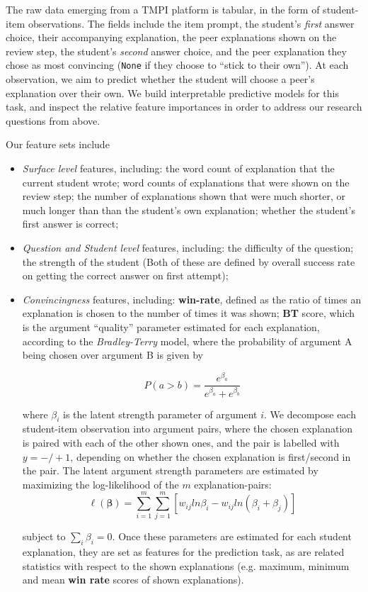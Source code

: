 \documentclass[sigconf]{acmart}
\begin{document}
The raw data emerging from a TMPI platform is tabular, in the form of 
student-item observations.
The fields include the item prompt, the student's \textit{first} answer choice, 
their accompanying explanation, the peer explanations shown on the review step, 
the student's \textit{second} answer choice, and the peer explanation they 
chose as most convincing (\verb|None| if they choose to ``stick to their own'').
At each observation, we aim to predict whether the student will choose a peer's 
explanation over their own.
We build interpretable predictive models for this task, and inspect the 
relative feature importances in order to address our research questions from 
above.

Our feature sets include
\begin{itemize}
	\item \textit{Surface level} features, including: 
	the word count of explanation that the current student wrote; 
	word counts of explanations that were shown on the review step; 
	the number of explanations shown that were much shorter, or much longer 
	than than the student's own explanation; 
	whether the student's first answer is correct;

	\item \textit{Question and Student level} features, including: 
	the difficulty of the question; 
	the strength of the student
	(Both of these are defined by overall success rate on getting the correct 
	answer on first attempt);
	
	\item \textit{Convincingness} features, including: 
	\textbf{win-rate}, defined as the ratio of times an explanation is chosen 
	to the number of times it was shown; 
	\textbf{BT} score, which is the argument ``quality'' parameter 
	estimated for each explanation, according to the \textit{Bradley-Terry} 
	model, where the probability of argument A being chosen over argument B is 
	given by 

$$
P(a>b) = 
\frac{e^{\beta_a}}{e^{\beta_a}+e^{\beta_b}}
$$

where $\beta_i$ is the latent strength parameter of argument $i$. 
We decompose each student-item observation into argument pairs, where the 
chosen explanation is paired with each of the other shown ones, and the pair is 
labelled with $y=-/+1$, depending on whether the chosen explanation is 
first/second in the pair.   
The latent argument strength parameters are estimated by maximizing the 
log-likelihood of the $m$ explanation-pairs:
$$
\ell(\boldsymbol{\beta})=\sum_{i=1}^{m}\sum_{j=1}^{m} 
[w_{ij}ln\beta_i-w_{ij}ln(\beta_i+\beta_j)]
$$

subject to $\sum_{i}\beta_i=0$.
Once these parameters are estimated for each student explanation, they are set 
as features for the prediction task, as are related statistics with respect to 
the shown explanations (e.g. maximum, minimum and mean \textbf{win rate} scores 
of shown 
explanations).
\end{itemize}
\end{document}
